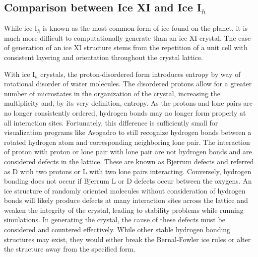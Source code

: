 %
%


\subsection{Comparison between Ice XI and Ice I$_{h}$}

While ice I$_{h}$ is known as the most common form of ice found on the planet, it is much more difficult to computationally generate than an ice XI crystal. 
The ease of generation of an ice XI structure stems from the repetition of a unit cell with consistent layering and orientation throughout the crystal lattice. 


With ice I$_{h}$ crystals, the proton-disordered form introduces entropy by way of rotational disorder of water molecules. 
The disordered protons allow for a greater number of microstates in the organization of the crystal, increasing the multiplicity and, by its very definition, entropy.
As the protons and lone pairs are no longer consistently ordered, hydrogen bonds may no longer form properly at all interaction sites. 
Fortunately, this difference is sufficiently small for visualization programs like Avogadro to still recognize hydrogen bonds between a rotated hydrogen atom and corresponding neighboring lone pair. 
The interaction of proton with proton or lone pair with lone pair are not hydrogen bonds and are considered defects in the lattice. 
These are known as Bjerrum defects and referred as D with two protons or L with two lone pairs interacting.\cite{BjerrumDefects}
Conversely, hydrogen bonding does not occur if Bjerrum L or D defects occur between the oxygens.
An ice structure of randomly oriented molecules without consideration of hydrogen bonds will likely produce defects at many interaction sites across the lattice and weaken the integrity of the crystal, leading to stability problems while running simulations. 
In generating the crystal, the cause of these defects must be considered and countered effectively.
While other stable hydrogen bonding structures may exist, they would either break the Bernal-Fowler ice rules or alter the structure away from the specified form.




